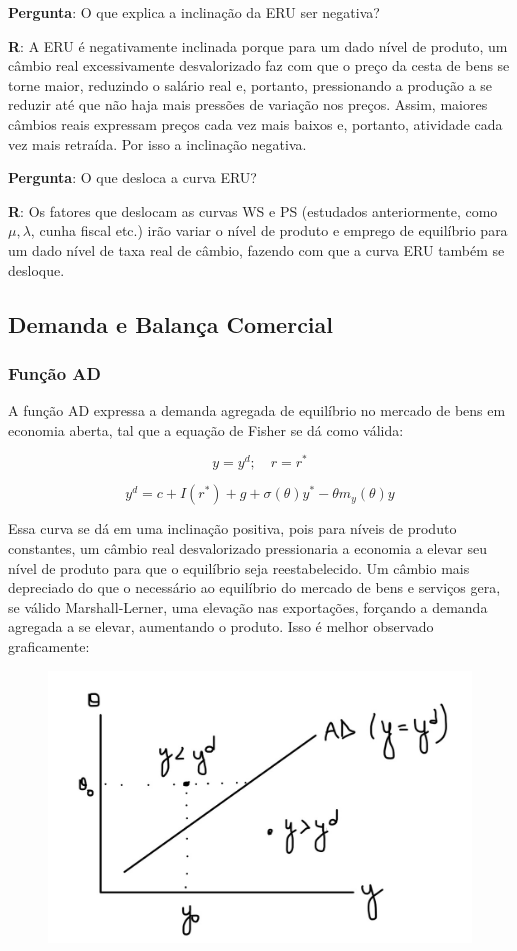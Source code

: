 \documentclass[a4paper,12pt]{article}[abntex2]
\begin{document}
\textbf{Pergunta}: O que explica a inclinação da ERU ser negativa? 

\textbf{R}:  A  ERU  é  negativamente  inclinada  porque  para  um  dado  nível  de  produto,  um  câmbio  real excessivamente desvalorizado faz com que o preço da cesta de bens se torne maior, reduzindo o salário real e, portanto, pressionando a produção a se reduzir até que não haja mais pressões de variação nos preços. Assim, maiores câmbios reais expressam preços cada vez mais baixos e, portanto, atividade cada vez mais retraída. Por isso a inclinação negativa. 

\textbf{Pergunta}: O que desloca a curva ERU? 

\textbf{R}: Os fatores que deslocam as curvas WS e PS (estudados anteriormente, como \(\mu , \lambda\), cunha fiscal etc.) irão variar o nível de produto e emprego de equilíbrio para um dado nível de taxa real de câmbio, fazendo com que a curva ERU também se desloque. 

\subsection{\textbf{Demanda e Balança Comercial}}
\subsubsection{\textbf{Função AD}}
A função AD expressa a demanda agregada de equilíbrio no mercado de bens em economia aberta, tal que a equação de Fisher se dá como válida:

\[
y = y^d; \quad r = r^*
\]

\[
y^d = c + I(r^*) + g + \sigma(\theta) y^* - \theta m_y(\theta) y
\]

Essa curva se dá em uma inclinação positiva, pois para níveis de produto constantes, um câmbio real desvalorizado pressionaria a economia a elevar seu nível de produto para que o equilíbrio seja reestabelecido. Um câmbio mais depreciado do que o necessário ao equilíbrio do mercado de bens e serviços gera, se válido Marshall-Lerner, uma elevação nas exportações, forçando a demanda agregada a se elevar, aumentando o produto. Isso é melhor observado graficamente:

\begin{figure}[H]
    \centering
    \includegraphics[width=0.7\linewidth]{Imagens/a26i4.png}
\end{figure}
\end{document}
